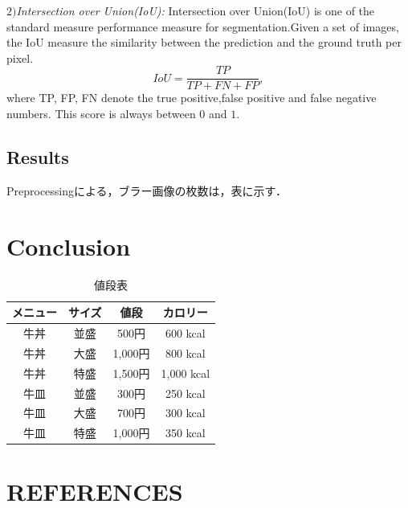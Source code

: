 \documentclass{article}
\begin{document}
\(2)\){\it Intersection over Union(IoU): } Intersection over Union(IoU) is one of the standard measure performance measure for segmentation.Given a set of images, the IoU measure the similarity between the prediction and the ground truth per pixel.
\begin{equation}
IoU=\frac{TP}{TP+FN+FP},
\end{equation}
where TP, FP, FN denote the true positive,false positive and false negative numbers. This score is always between $0$ and $1$.
\subsection{Results}
Preprocessingによる，ブラー画像の枚数は，表に示す．
\section{Conclusion}
\label{sec:con}

\begin{table}[htb]
\begin{center}
\caption{値段表}
 \begin{tabular}{|c|c|c||c|}\hline
     メニュー & サイズ & 値段 & カロリー \\ \hline \hline
    牛丼 & 並盛 & 500円 & 600 kcal \\
    牛丼 & 大盛 & 1,000円 & 800 kcal \\
    牛丼 & 特盛 & 1,500円 & 1,000 kcal \\ \hline
    牛皿 & 並盛 & 300円 & 250 kcal \\
    牛皿 & 大盛 & 700円 & 300 kcal \\
    牛皿 & 特盛 & 1,000円 & 350 kcal \\ \hline
     \end{tabular}
     \end{center}
\end{table}

\vfill\pagebreak

\section{REFERENCES}
\label{sec:refs}
\end{document}
